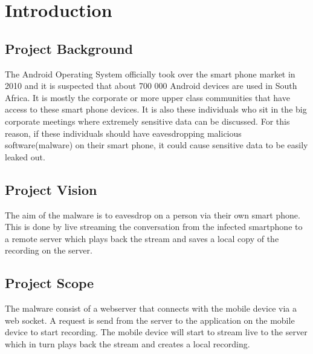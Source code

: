 	
	
	\newpage
	\tableofcontents
	\newpage
	\section{Introduction}
	\subsection{Project Background}

The Android Operating System officially took over the smart phone market in 2010 and it is suspected that about 700 000 Android devices are used in South Africa. It is mostly the corporate or more upper class communities that have access to these smart phone devices. It is also these individuals who sit in the big corporate meetings where extremely sensitive data can be discussed. For this reason, if these individuals should have eavesdropping malicious software(malware) on their smart phone, it could cause sensitive data to be easily leaked out.


		\subsection{Project Vision}
The aim of the malware is to eavesdrop on a person via their own smart phone. This is done by live streaming the conversation from the infected smartphone to a remote server which plays back the stream and saves a local copy of the recording on the server.
		\subsection{Project Scope}
The malware consist of a webserver that connects with the mobile device via a web socket. A request is send from the server to the application on the mobile device to start recording. The mobile device will start to stream live to the server which in turn plays back the stream and creates a local recording.

\newpage


